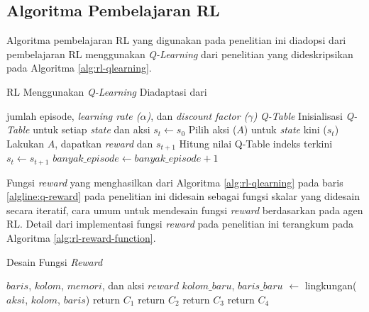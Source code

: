 \subsection{Algoritma Pembelajaran \acl{RL}}
\label{sec:sub-pembelajaran-rl}

Algoritma pembelajaran \ac{RL} yang digunakan pada penelitian ini diadopsi dari pembelajaran \ac{RL} menggunakan \textit{Q-Learning} dari penelitian \parencite{sutisna2023faraneq} yang dideskripsikan pada Algoritma \ref{alg:rl-qlearning}.

\begin{algorithm}
	\makeatletter
	\renewcommand{\ALG@name}{Algoritma}
	\makeatother
	\caption{\ac{RL} Menggunakan \textit{Q-Learning} Diadaptasi dari \parencite{sutisna2023faraneq}}\label{alg:rl-qlearning}
	\renewcommand{\algorithmicrequire}{\textbf{Masukan:}}
	\renewcommand{\algorithmicensure}{\textbf{Keluaran:}}
	\begin{algorithmic}[1]
		\Require jumlah episode, \textit{learning rate ($\alpha$)}, dan \textit{discount factor ($\gamma$)}
		\Ensure \textit{Q-Table}
		\State Inisialisasi \textit{Q-Table} untuk setiap \textit{state} dan aksi
		\State $s_{t} \gets s_0$
		\State Pilih aksi ($A$) untuk \textit{state} kini ($s_t$)
		\State Lakukan $A$, dapatkan \textit{reward} dan $s_{t+1}$ \label{algline:q-reward}
		\State Hitung nilai Q-Table indeks terkini 
		\State $s_t \gets s_{t+1}$
		\EndWhile
		\State $banyak\_episode \gets banyak\_episode + 1$
		\EndWhile
	\end{algorithmic}
\end{algorithm}

Fungsi \textit{reward} yang menghasilkan dari Algoritma \ref{alg:rl-qlearning} pada baris \ref{algline:q-reward} pada penelitian ini didesain sebagai fungsi skalar yang didesain secara iteratif, cara umum untuk mendesain fungsi \textit{reward} berdasarkan \parencite{hayes2022practical} pada agen \ac{RL}. Detail dari implementasi fungsi \textit{reward} pada penelitian ini terangkum pada Algoritma \ref{alg:rl-reward-function}.

\begin{algorithm}
	\makeatletter
	\renewcommand{\ALG@name}{Algoritma}
	\makeatother
	\caption{Desain Fungsi \textit{Reward}}\label{alg:rl-reward-function}
	\renewcommand{\algorithmicrequire}{\textbf{Masukan:}}
	\renewcommand{\algorithmicensure}{\textbf{Keluaran:}}
	\begin{algorithmic}[1]
		\Require $baris$, $kolom$, $memori$, dan aksi
		\Ensure $reward$
		\State $kolom\_baru$, $baris\_baru$ $\gets$ lingkungan($aksi$, $kolom$, $baris$)
		 \label{algline:reward-c1}
		\State return $C_1$
		\EndIf
		 \label{algline:reward-c2}
		\State return $C_2$
		\EndIf
		 \label{algline:reward-c3}
		\State return $C_3$
		\EndIf
		\State return $C_4$ \label{algline:reward-c4}
	\end{algorithmic}
\end{algorithm}

